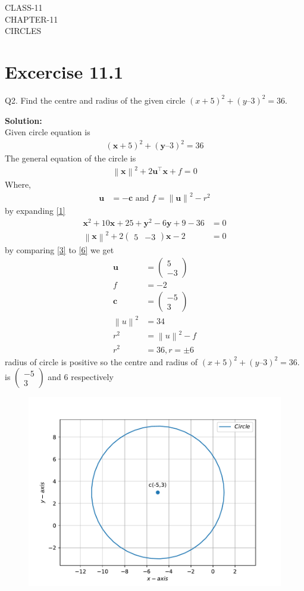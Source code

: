 \documentclass[12pt]{article}
\providecommand{\norm}[1]{\left\lVert#1\right\rVert}
\newcommand{\solution}{\noindent \textbf{Solution: }}
\newcommand{\myvec}[1]{\ensuremath{\begin{pmatrix}#1\end{pmatrix}}}
\let\vec\mathbf
\begin{document}
\begin{center}
\textbf\large{CLASS-11\\CHAPTER-11 \\ CIRCLES}

\end{center}
\section*{Excercise 11.1}

Q2. Find the centre and radius of the given circle $(x + 5)^2 + (y – 3)^2 = 36.$

\solution
\\
Given circle equation is
\begin{align}
	(\vec{x} + 5)^2 + (\vec{y} – 3)^2 = 36 \label{1}
\end{align}
The general equation of  the circle is 
\begin{align}
	\norm{\vec{x}}^{2} + 2\vec{u}^{\top}\vec{x} + f = 0
\end{align}
Where,
\begin{align}
	\vec{u} &= -\vec{c} \text{ and } f = \norm{\vec{u}}^{2} - r^{2}\label{3}
\end{align}
by expanding \eqref{1}
\begin{align}
	\vec{x}^2+10\vec{x}+25+\vec{y}^2-6\vec{y}+9-36&=0\\
	\norm{\vec{x}}^2+2\myvec{5 & -3}\vec{x}-2&=0\label{6}
\end{align}	
by comparing \eqref{3} to \eqref{6} we get
\begin{align}
 \vec{u}&=\myvec{5\\ -3}\\
 f&=-2\\
\vec{c}&=\myvec{-5 \\ 3}\\
\norm{u}^2&=34\\
r^2&=\norm{u}^2-f\\
r^2&= 36,r=\pm6
\end{align}
radius of circle is positive so 
the centre and radius of $(x + 5)^2 + (y – 3)^2 = 36.$ is $\myvec{-5 \\ 3}$ and $6$ respectively
\begin{figure}[!h]
	\begin{center} 
	   \includegraphics[width=\columnwidth]{figs/fig.pdf}
	\end{center}
\caption{}
\label{fig:Fig1}
\end{figure}
\end{document}

